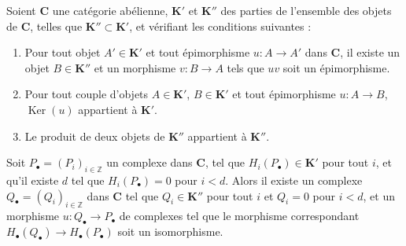 \begin{proposition}[11.9.1]
\label{0.11.9.1-fr}
Soient $\boldsymbol{C}$ une catégorie abélienne, $\boldsymbol{K}'$ et $\boldsymbol{K}''$ des parties de
l'ensemble des objets de $\boldsymbol{C}$, telles que $\boldsymbol{K}''\subset\boldsymbol{K}'$, et
vérifiant les conditions suivantes :
\begin{enumerate}
\item[{\rm(i)}] Pour tout objet $A'\in\boldsymbol{K}'$ et tout épimorphisme
$u:A\to A'$ dans $\boldsymbol{C}$, il existe un objet $B\in\boldsymbol{K}''$ et un morphisme
$v:B\to A$ tels que $uv$ soit un épimorphisme.
\item[{\rm(ii)}] Pour tout couple d'objets $A\in\boldsymbol{K}'$, $B\in\boldsymbol{K}'$ et
tout épimorphisme $u:A\to B$, $\operatorname{Ker}(u)$ appartient à $\boldsymbol{K}'$.
\item[{\rm(iii)}] Le produit de deux objets de $\boldsymbol{K}''$ appartient à
$\boldsymbol{K}''$.
\end{enumerate}
Soit $P_\bullet=(P_i)_{i\in\mathbb Z}$ un complexe dans $\boldsymbol{C}$,
tel que $H_i(P_\bullet)\in\boldsymbol{K}'$ pour tout $i$, et qu'il existe $d$ tel que
$H_i(P_\bullet)=0$ pour $i<d$. Alors il existe un complexe
$Q_\bullet=(Q_i)_{i\in\mathbb Z}$ dans $\boldsymbol{C}$ tel que $Q_i\in\boldsymbol{K}''$
pour tout $i$ et $Q_i=0$ pour $i<d$, et un morphisme
$u:Q_\bullet\to P_\bullet$ de complexes tel que le morphisme correspondant
$H_\bullet(Q_\bullet)\to H_\bullet(P_\bullet)$ soit un isomorphisme.
\end{proposition}

